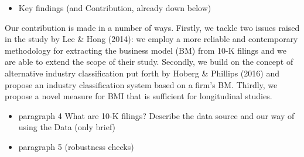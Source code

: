 \documentclass[
]{article}
\providecommand{\tightlist}{%
  \setlength{\itemsep}{0pt}\setlength{\parskip}{0pt}}\usepackage{longtable,booktabs,array}
\begin{document}
\begin{itemize}
\tightlist
\item
  Key findings (and Contribution, already down below)
\end{itemize}

Our contribution is made in a number of ways. Firstly, we tackle two
issues raised in the study by Lee \& Hong (2014): we employ a more
reliable and contemporary methodology for extracting the business model
(BM) from 10-K filings and we are able to extend the scope of their
study. Secondly, we build on the concept of alternative industry
classification put forth by Hoberg \& Phillips (2016) and propose an
industry classification system based on a firm's BM. Thirdly, we propose
a novel measure for BMI that is sufficient for longitudinal studies.

\begin{itemize}
\item
  paragraph 4 What are 10-K filings? Describe the data source and our
  way of using the Data (only brief)
\item
  paragraph 5 (robustness checks)
\end{itemize}
\end{document}
